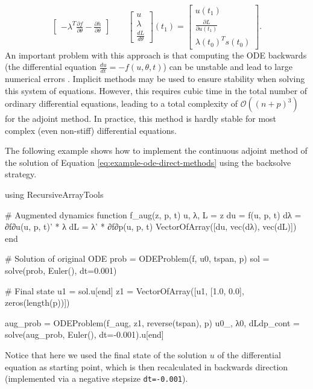 \begin{enumerate}
\begin{equation}
\begin{bmatrix}
       - \lambda^T \frac{\partial f}{\partial \theta} - \frac{\partial h}{\partial \theta}
    \end{bmatrix}
    \qquad 
    \begin{bmatrix}
       u \\
       \lambda \\
       \frac{dL}{d\theta}
    \end{bmatrix}(t_1)
    = 
    \begin{bmatrix}
       u(t_1) \\
       \frac{\partial L}{\partial u(t_1)} \\
       \lambda(t_0)^T s(t_0)
    \end{bmatrix}.
    \end{equation}
    An important problem with this approach is that computing the ODE backwards (the differential equation $\frac{du}{dt} = - f(u,\theta, t)$) can be unstable and lead to large numerical errors \cite{kim_stiff_2021, Zhuang_2020}. 
    Implicit methods may be used to ensure stability when solving this system of equations. 
    However, this requires cubic time in the total number of ordinary differential equations, leading to a total complexity of $\mathcal O((n+p)^3)$ for the adjoint method. In practice, this method is hardly stable for most complex (even non-stiff) differential equations. 
\end{enumerate} 

The following example shows how to implement the continuous adjoint method of the solution of Equation \eqref{eq:example-ode-direct-methods} using the backsolve strategy. 
\begin{jllisting}
using RecursiveArrayTools

# Augmented dynamics
function f_aug(z, p, t)
    u, λ, L = z
    du = f(u, p, t)
    dλ = ∂f∂u(u, p, t)' * λ
    dL = λ' * ∂f∂p(u, p, t)
    VectorOfArray([du, vec(dλ), vec(dL)])
end

# Solution of original ODE
prob = ODEProblem(f, u0, tspan, p)
sol = solve(prob, Euler(), dt=0.001)

# Final state 
u1 = sol.u[end]
z1 = VectorOfArray([u1, [1.0, 0.0], zeros(length(p))])

aug_prob = ODEProblem(f_aug, z1, reverse(tspan), p)
u0_, λ0, dLdp_cont = solve(aug_prob, Euler(), dt=-0.001).u[end]
\end{jllisting}
Notice that here we used the final state of the solution $u$ of the differential equation as starting point, which is then recalculated in backwards direction (implemented via a negative stepsize \texttt{dt=-0.001}). 


